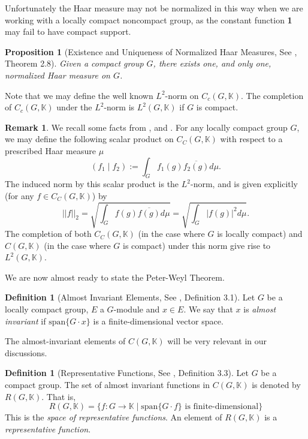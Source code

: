 \documentclass{amsart}
\newtheorem{proposition}[theorem]{Proposition}
\theoremstyle{definition}
\newtheorem{definition}[theorem]{Definition}
\newtheorem{remark}[theorem]{Remark}
\numberwithin{equation}{section}
\newcommand{\cgk}{C(G,\mathbb{K})}
\newcommand{\rgk}{R(G,\mathbb{K})}
\newcommand{\lgk}{L^2 (G,\mathbb{K})}
\newcommand{\lck}{L^2 (G,\mathbb{K})}
\newcommand{\cck}{C_C (G,\mathbb{K})}
\newcommand{\K}{\mathbb{K}}
\begin{document}
Unfortunately the Haar measure may not be normalized in this way when we are working with a locally compact noncompact group, as the constant function \textbf{1} may fail to have compact support. 

\begin{proposition}[Existence and Uniqueness of Normalized Haar Measures, See \cite{hofmann}, Theorem 2.8] Given a compact group $G$, there exists one, and only one, normalized Haar measure on $G$.
\end{proposition}

Note that we may define the well known $L^2$-norm on $C_c(G,\K)$. The completion of $C_c(G,\K)$ under  the $L^2$-norm is $\lgk$ if $G$ is compact. 
\begin{remark}\label{l2definition} We recall some facts from \cite[Example 2.12]{hofmann}, \cite[Chapter 3]{rudin} and \cite[Lemma 14.6]{stroppel}.  For any locally compact group $G$, we may define the following scalar product on $\cck$ with respect to a prescribed Haar measure $\mu$
 \[
 (f_1\mid f_2):=\int_G{f_1(g)\overline{f_2(g)}}{ d \mu}.		
 \] 
 The induced norm  by this scalar product is  the $L^2$-norm, and is given explicitly (for any $f\in\cck$) by
 \[
 ||f||_2=\sqrt{\int_G{f(g)\overline{f(g)}}{ d \mu}}=\sqrt{\int_G{|f(g)|^2}{ d \mu}}.
 \]
 The completion of both $\cck$ (in the case where $G$ is locally compact) and $\cgk$ (in the case where $G$ is compact) under this norm give rise to $\lck$.
\end{remark}

 

We are now almost ready to state the Peter-Weyl Theorem. 

\begin{definition}[Almost Invariant Elements, See \cite{hofmann}, Definition 3.1]Let $G$ be a locally compact group, $E$ a $G$-module and $x\in E$. We say that $x$ is \textit{almost invariant} if $\mathrm{span}\{G\cdot x\}$ is a finite-dimensional vector space. \end{definition}



The almost-invariant elements of $\cgk$ will be very relevant in our discussions.



\begin{definition}[Representative Functions, See \cite{hofmann}, Definition 3.3]\label{defrepresentativefunctions}Let $G$ be a compact group. The set of almost invariant functions in $\cgk$ is denoted by $\rgk$. That is,
\[\rgk=\{f:G\rightarrow\K \mid \mathrm{span}\{G\cdot f\} \mbox{ is finite-dimensional}\}\]
This is  the \textit{space of representative functions}. An element of $\rgk$ is  a \textit{representative function}.
\end{definition}
\end{document}
